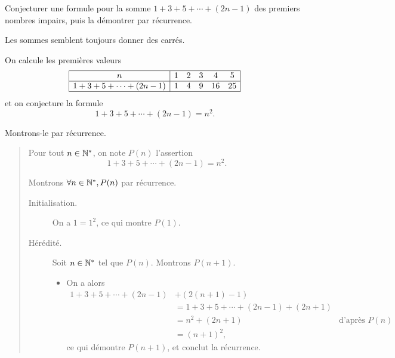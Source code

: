 \begin{exo}
Conjecturer une formule pour la somme $1 + 3 + 5 + \cdots + (2n-1)$ des premiers nombres impairs, puis la démontrer par récurrence.
\begin{hint}
Les sommes semblent toujours donner des carrés.
\end{hint}
\begin{sol}
On calcule les premières valeurs
\[ \begin{array}{|c|ccccc|} \hline n & 1 & 2 & 3 & 4 & 5 \\ \hline 1 + 3 + 5 + \cdots + (2n-1) & 1 & 4 & 9 & 16 & 25  \\ \hline \end{array}\]
et on conjecture la formule
\[ 1 + 3 + 5 + \cdots + (2n-1) = n^2.\]

Montrons-le par récurrence.

\begin{quote}
  Pour tout $n \in \mathbb N^*$, on note $P(n)$ l'assertion
  \[ 1 + 3 + 5 + \cdots + (2n-1) = n^2.\]

  Montrons $\forall n \in \mathbb N^*, P(n)$ par récurrence.

  \begin{description}
  \item[Initialisation.] On a $1 = 1^2$, ce qui montre $P(1)$.
  \item[Hérédité.] Soit $n \in \mathbb N^*$ tel que $P(n)$. Montrons $P(n+1)$.
    \begin{itemize}
    \item [] On a alors
      \begin{align*}
        1 + 3 + 5 + \cdots + (2n-1) &+ (2(n+1) - 1) \\
     &= 1 + 3 + 5 + \cdots + (2n-1) + (2n+1) \\
                                                   &= n^2 + (2n+1) & \text{d'après $P(n)$}\\
        &= (n+1)^2,
      \end{align*}
      ce qui démontre $P(n+1)$, et conclut la récurrence.
    \end{itemize}
  \end{description}
\end{quote}
\end{sol}
\end{exo}



